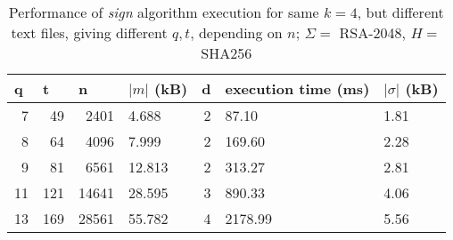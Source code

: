 \begin{table}[ht]
\centering
\begin{tabular}{rrrlrll}
\hline
\multicolumn{1}{|l|}{\textbf{q}} & \multicolumn{1}{l|}{\textbf{t}} & \multicolumn{1}{l|}{\textbf{n}} & \multicolumn{1}{l|}{\textbf{$|m|$} (kB)} & \multicolumn{1}{l|}{\textbf{d}} & \multicolumn{1}{l|}{\textbf{execution time (ms)}} & \multicolumn{1}{l|}{\textbf{$|\sigma|$ (kB)}} \\ \hline
7                                & 49                              & 2401                            & 4.688                          & 2                               & 87.10                                     & 1.81                               \\
8                                & 64                              & 4096                            & 7.999                          & 2                               & 169.60                                     & 2.28                               \\
9                                & 81                              & 6561                            & 12.813                         & 2                               & 313.27                                     & 2.81                               \\
11                               & 121                             & 14641                           & 28.595                         & 3                               & 890.33                                     & 4.06                               \\
13                               & 169                             & 28561                           & 55.782                         & 4                               & 2178.99                                     & 5.56                              
\end{tabular}
    \caption{Performance of \textit{sign} algorithm execution for same $k = 4$, but different text files, giving different $q, t$, depending on $n$; $\Sigma = $ RSA-2048, $H = $ SHA256}
    \label{table:performance-signature-using-same-k}
\end{table}